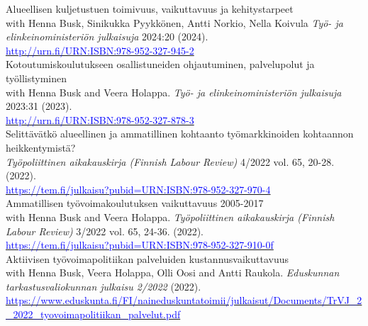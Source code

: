 \documentclass[16pt]{article}
\begin{document}
\noindent Alueellisen kuljetustuen toimivuus, vaikuttavuus ja kehitystarpeet \\
\noindent with Henna Busk, Sinikukka Pyykkönen, Antti Norkio, Nella Koivula \textit{Työ- ja elinkeinoministeriön julkaisuja} 2024:20 (2024). \\
\noindent \href{http://urn.fi/URN:ISBN:978-952-327-945-2}{\textcolor{blue}{http://urn.fi/URN:ISBN:978-952-327-945-2}} \\

\noindent Kotoutumiskoulutukseen osallistuneiden ohjautuminen, palvelupolut ja työllistyminen\\
\noindent with Henna Busk and Veera Holappa. \textit{Työ- ja elinkeinoministeriön julkaisuja} 2023:31 (2023). \\
\noindent \href{http://urn.fi/URN:ISBN:978-952-327-878-3}{\textcolor{blue}{http://urn.fi/URN:ISBN:978-952-327-878-3}} \\

\noindent Selittävätkö alueellinen ja ammatillinen kohtaanto työmarkkinoiden kohtaannon heikkentymistä?\\
\noindent \textit{Työpoliittinen aikakauskirja (Finnish Labour Review)} 4/2022 vol. 65, 20-28.  (2022). \\
\noindent \href{https://tem.fi/julkaisu?pubid=URN:ISBN:978-952-327-970-4}{\textcolor{blue}{https://tem.fi/julkaisu?pubid=URN:ISBN:978-952-327-970-4}} \\

\noindent Ammatillisen työvoimakoulutuksen vaikuttavuus 2005-2017 \\
\noindent  with Henna Busk and Veera Holappa. \textit{Työpoliittinen aikakauskirja (Finnish Labour Review)} 3/2022 vol. 65, 24-36.  (2022).  \\
\noindent \href{https://tem.fi/julkaisu?pubid=URN:ISBN:978-952-327-910-0}{\textcolor{blue}{https://tem.fi/julkaisu?pubid=URN:ISBN:978-952-327-910-0f}} \\

\noindent Aktiivisen työvoimapolitiikan palveluiden kustannusvaikuttavuus \\
\noindent with Henna Busk, Veera Holappa, Olli Oosi and Antti Raukola. \textit{Eduskunnan tarkastusvaliokunnan julkaisu 2/2022} (2022). \\
\noindent  \href{https://www.eduskunta.fi/FI/naineduskuntatoimii/julkaisut/Documents/TrVJ\_2\_2022\_tyovoimapolitiikan\_palvelut.pdf}{\textcolor{blue}{https://www.eduskunta.fi/FI/naineduskuntatoimii/julkaisut/Documents/TrVJ\_2\_2022\_tyovoimapolitiikan\_palvelut.pdf}} \\
\end{document}
